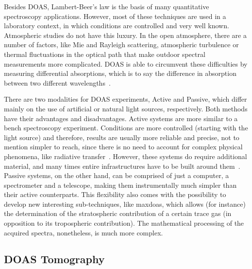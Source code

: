 Besides \gls{DOAS}, Lambert-Beer's law is the basis of many quantitative
spectroscopy applications. However, most of these techniques are used in
a laboratory context, in which conditions are controlled and very well
known. Atmospheric studies do not have this luxury. In the open
atmosphere, there are a number of factors, like Mie and Rayleigh
scattering, atmospheric turbulence or thermal fluctuations in the
optical path that make outdoor spectral measurements more complicated.
\gls{DOAS} is able to circumvent these difficulties by measuring
differential absorptions, which is to say the difference in absorption
between two different wavelengths~\cite{Platt2007, Merlaud2013}.

There are two modalities for \gls{DOAS} experiments, Active and Passive,
which differ mainly on the use of artificial or natural light sources,
respectively. Both methods have their advantages and disadvantages.
Active systems are more similar to a bench spectroscopy experiment.
Conditions are more controlled (starting with the light source) and
therefore, results are usually more reliable and precise, not to mention
simpler to reach, since there is no need to account for complex physical
phenomena, like radiative transfer~\cite{Platt2007}. However, these
systems do require additional material, and many times entire
infrastructures have to be built around them~\cite{Pundt2005}. Passive
systems, on the other hand, can be comprised of just a computer, a
spectrometer and a telescope, making them instrumentally much simpler
than their active counterparts. This flexibility also comes with the
possibility to develop new interesting sub-techniques, like
\gls{maxdoas}, which allows (for instance) the determination of the
stratospheric contribution of a certain trace gas (in opposition to its
tropospheric contribution). The mathematical processing of the acquired
spectra, nonetheless, is much more complex.

\subsection{DOAS Tomography}%
\label{sub:doas_tomography}

